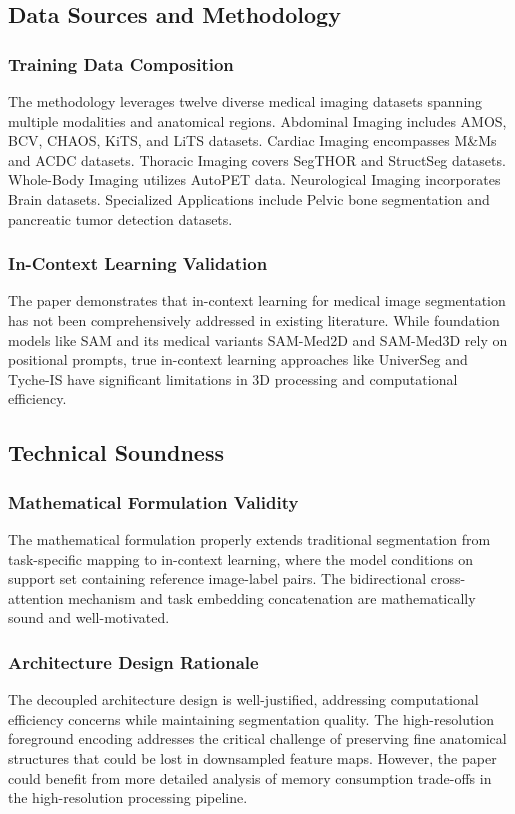 \subsection{Data Sources and Methodology}
\subsubsection{Training Data Composition}
The methodology leverages twelve diverse medical imaging datasets spanning multiple modalities and anatomical regions. Abdominal Imaging includes AMOS, BCV, CHAOS, KiTS, and LiTS datasets. Cardiac Imaging encompasses M&Ms and ACDC datasets. Thoracic Imaging covers SegTHOR and StructSeg datasets. Whole-Body Imaging utilizes AutoPET data. Neurological Imaging incorporates Brain datasets. Specialized Applications include Pelvic bone segmentation and pancreatic tumor detection datasets.

\subsubsection{In-Context Learning Validation}
The paper demonstrates that in-context learning for medical image segmentation has not been comprehensively addressed in existing literature. While foundation models like SAM and its medical variants SAM-Med2D and SAM-Med3D rely on positional prompts, true in-context learning approaches like UniverSeg and Tyche-IS have significant limitations in 3D processing and computational efficiency.

\subsection{Technical Soundness}
\subsubsection{Mathematical Formulation Validity}
The mathematical formulation properly extends traditional segmentation from task-specific mapping to in-context learning, where the model conditions on support set containing reference image-label pairs. The bidirectional cross-attention mechanism and task embedding concatenation are mathematically sound and well-motivated.

\subsubsection{Architecture Design Rationale}
The decoupled architecture design is well-justified, addressing computational efficiency concerns while maintaining segmentation quality. The high-resolution foreground encoding addresses the critical challenge of preserving fine anatomical structures that could be lost in downsampled feature maps. However, the paper could benefit from more detailed analysis of memory consumption trade-offs in the high-resolution processing pipeline.

